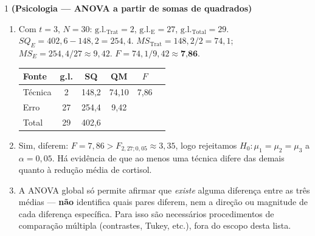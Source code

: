 \documentclass[11pt]{article}
\begin{document}

\begin{questao}{1} \textbf{(Psicologia --- ANOVA a partir de somas de quadrados)}
\end{questao}
\begin{solucao}
\begin{enumerate}[label=(\alph*)]
  \item Com $t=3$, $N=30$: $\mathrm{g.l._{Trat}} = 2$, $\mathrm{g.l._{E}} = 27$,
    $\mathrm{g.l._{Total}} = 29$. $SQ_E = 402{,}6 - 148{,}2 = 254{,}4$.
    $MS_{\text{Trat}} = 148{,}2/2 = 74{,}1$; $MS_E = 254{,}4/27 \approx 9{,}42$.
    $F = 74{,}1/9{,}42 \approx \textbf{7{,}86}$.

  \begin{center}
  \begin{tabular}{lccccc}
  \toprule
  Fonte & g.l. & SQ & QM & $F$ \\
  \midrule
  Técnica & 2 & 148{,}2 & 74{,}10 & 7{,}86 \\
  Erro & 27 & 254{,}4 & 9{,}42 & \\
  Total & 29 & 402{,}6 & & \\
  \bottomrule
  \end{tabular}
  \end{center}

  \item Sim, diferem: $F=7{,}86 > F_{2,27;0{,}05}\approx 3{,}35$, logo rejeitamos
    $H_0:\mu_1=\mu_2=\mu_3$ a $\alpha=0{,}05$. Há evidência de que ao menos uma técnica difere das
    demais quanto à redução média de cortisol.
  \item A ANOVA global só permite afirmar que \emph{existe} alguma diferença entre as três médias
    --- \textbf{não} identifica quais pares diferem, nem a direção ou magnitude de cada diferença
    específica. Para isso são necessários procedimentos de comparação múltipla (contrastes,
    Tukey, etc.), fora do escopo desta lista.
\end{enumerate}
\end{solucao}
\end{document}
